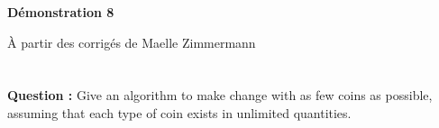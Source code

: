 \documentclass[11pt]{article} %
\newenvironment{question}[1][\unskip]{%
	\par
	\noindent
	\textbf{Question #1:}
	\noindent}
{\medskip}
\begin{document}

	\noindent \hrulefill
	\centerline{\bfseries Démonstration 8}
	\centerline{À partir des corrigés de Maelle Zimmermann}	
	\noindent \hrulefill
	
	\vspace{1cm}
	
	\section{}
	\begin{question}
		Give an algorithm to make change with as few coins as possible, assuming that each type of coin exists in unlimited quantities.
	\end{question}
	
\end{document}
